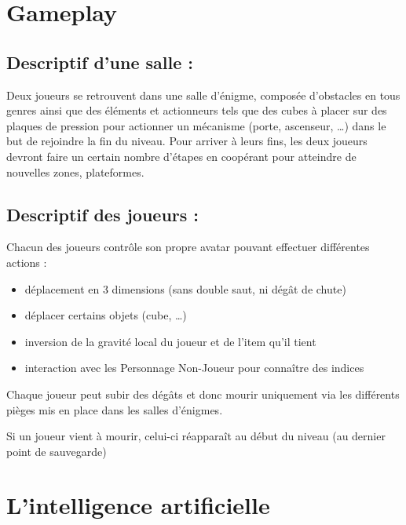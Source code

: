 \documentclass[a4paper,11pt]{article}
\begin{document}
\section{Gameplay}

\subsection{Descriptif d’une salle :} 

Deux joueurs se retrouvent dans une salle d'énigme, 
composée d’obstacles en tous genres ainsi que des éléments et actionneurs tels que des cubes 
à placer sur des plaques de pression pour actionner un mécanisme (porte, ascenseur, …) dans 
le but de rejoindre la fin du niveau. Pour arriver à leurs fins, les deux joueurs devront faire 
un certain nombre d’étapes en coopérant pour atteindre de nouvelles zones, plateformes.\newline

\subsection{Descriptif des joueurs :} 

Chacun des joueurs contrôle son propre avatar pouvant effectuer différentes actions : 
\newline

\begin{itemize}
    \item déplacement en 3 dimensions (sans double saut, ni dégât de chute)
    \item déplacer certains objets (cube, …)
    \item inversion de la gravité local du joueur et de l’item qu’il tient
    \item interaction avec les Personnage Non-Joueur pour connaître des indices \newline
\end{itemize}



Chaque joueur peut subir des dégâts et donc mourir uniquement via les différents pièges
 mis en place dans les salles d'énigmes.

Si un joueur vient à mourir, celui-ci réapparaît au début du niveau (au dernier point de sauvegarde) 

\section{L’intelligence artificielle}
\end{document}
